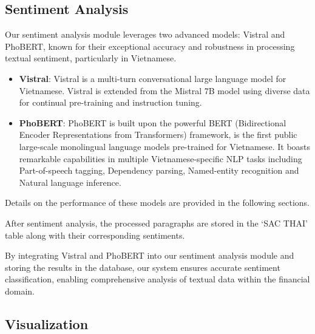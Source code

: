 {%
\subsection{Sentiment Analysis}

Our sentiment analysis module leverages two advanced models: Vistral and PhoBERT, known for their exceptional accuracy and robustness in processing textual sentiment, particularly in Vietnamese.
\begin{itemize}
    \item \textbf{Vistral}: Vistral is a multi-turn conversational large language model for Vietnamese. Vistral is extended from the Mistral 7B model using diverse data for continual pre-training and instruction tuning.
    \item \textbf{PhoBERT}: PhoBERT is built upon the powerful BERT (Bidirectional Encoder Representations from Transformers) framework, is the first public large-scale monolingual language models pre-trained for Vietnamese. It boasts remarkable capabilities in multiple Vietnamese-specific NLP tasks including Part-of-speech tagging, Dependency parsing, Named-entity recognition and Natural language inference.
\end{itemize}

Details on the performance of these models are provided in the following sections.

After sentiment analysis, the processed paragraphs are stored in the `SAC THAI' table along with their corresponding sentiments.\par
By integrating Vistral and PhoBERT into our sentiment analysis module and storing the results in the database, our system ensures accurate sentiment classification, enabling comprehensive analysis of textual data within the financial domain.

\subsection{Visualization}

}
